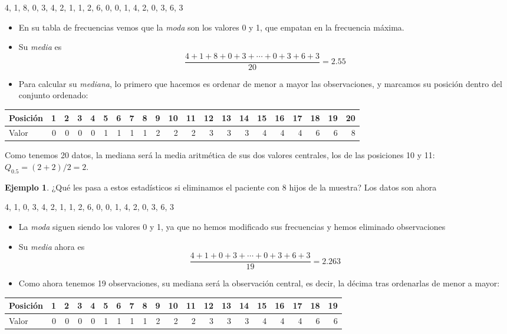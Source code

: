 \documentclass[
]{book}
\theoremstyle{definition}
\theoremstyle{definition}
\newtheorem{example}{Ejemplo}[chapter]
\theoremstyle{definition}
\theoremstyle{definition}
\theoremstyle{remark}
\begin{document}
4, 1, 8, 0, 3, 4, 2, 1, 1, 2, 6, 0, 0, 1, 4, 2, 0, 3, 6, 3

\begin{itemize}
\item
  En su tabla de frecuencias vemos que la \emph{moda} son los valores 0 y 1, que empatan en la frecuencia máxima.
\item
  Su \emph{media} es
  \[
  \frac{4+1+8+0+3+\cdots+0+3+6+3}{20}=2.55
  \]
\item
  Para calcular su \emph{mediana}, lo primero que hacemos es ordenar de menor a mayor las observaciones, y marcamos su posición dentro del conjunto ordenado:
\end{itemize}

\begin{table}
\centering
\begin{tabular}{l|r|r|r|r|r|r|r|r|r|r|r|r|r|r|r|r|r|r|r|r}
\hline
Posición & 1 & 2 & 3 & 4 & 5 & 6 & 7 & 8 & 9 & 10 & 11 & 12 & 13 & 14 & 15 & 16 & 17 & 18 & 19 & 20\\
\hline
Valor & 0 & 0 & 0 & 0 & 1 & 1 & 1 & 1 & 2 & 2 & 2 & 3 & 3 & 3 & 4 & 4 & 4 & 6 & 6 & 8\\
\hline
\end{tabular}
\end{table}

Como tenemos 20 datos, la mediana será la media aritmética de sus dos valores centrales, los de las posiciones 10 y 11: \(Q_{0.5}=(2+2)/2=2\).

\begin{example}
\protect\hypertarget{exm:sexoger6}{}\label{exm:sexoger6}¿Qué les pasa a estos estadísticos si eliminamos el paciente con 8 hijos de la muestra? Los datos son ahora
\end{example}

4, 1, 0, 3, 4, 2, 1, 1, 2, 6, 0, 0, 1, 4, 2, 0, 3, 6, 3

\begin{itemize}
\item
  La \emph{moda} siguen siendo los valores 0 y 1, ya que no hemos modificado sus frecuencias y hemos eliminado observaciones
\item
  Su \emph{media} ahora es
  \[
  \frac{4+1+0+3+\cdots+0+3+6+3}{19}=2.263
  \]
\item
  Como ahora tenemos 19 observaciones, su mediana será la observación central, es decir, la décima tras ordenarlas de menor a mayor:
\end{itemize}

\begin{table}
\centering
\begin{tabular}{l|r|r|r|r|r|r|r|r|r|r|r|r|r|r|r|r|r|r|r}
\hline
Posición & 1 & 2 & 3 & 4 & 5 & 6 & 7 & 8 & 9 & 10 & 11 & 12 & 13 & 14 & 15 & 16 & 17 & 18 & 19\\
\hline
Valor & 0 & 0 & 0 & 0 & 1 & 1 & 1 & 1 & 2 & 2 & 2 & 3 & 3 & 3 & 4 & 4 & 4 & 6 & 6\\
\hline
\end{tabular}
\end{table}
\end{document}
